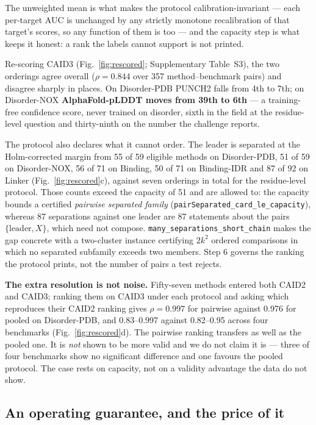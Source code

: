\documentclass[11pt,a4paper]{article}
\newcommand{\code}[1]{\texttt{\small #1}}
\begin{document}
The unweighted mean is what makes the protocol calibration-invariant --- each
per-target AUC is unchanged by any strictly monotone recalibration of that
target's scores, so any function of them is too --- and the capacity step is what
keeps it honest: a rank the labels cannot support is not printed.

Re-scoring CAID3 (Fig.~\ref{fig:rescored}; Supplementary Table~S3), the two
orderings agree overall ($\rho = 0.844$ over 357 method--benchmark pairs) and
disagree sharply in places. On Disorder-PDB PUNCH2 falls from 4th to 7th; on
Disorder-NOX \textbf{AlphaFold-pLDDT moves from 39th to 6th} --- a training-free
confidence score, never trained on disorder, sixth in the field at the
residue-level question and thirty-ninth on the number the challenge reports.

The protocol also declares what it cannot order. The leader is separated at the
Holm-corrected margin from 55 of 59 eligible methods on Disorder-PDB, 51 of 59
on Disorder-NOX, 56 of 71 on Binding, 50 of 71 on Binding-IDR and 87 of 92 on
Linker (Fig.~\ref{fig:rescored}c), against seven orderings in total for the
residue-level protocol. Those counts exceed the capacity of 51 and are allowed
to: the capacity bounds a certified \emph{pairwise separated family}
(\code{pairSeparated\_card\_le\_capacity}), whereas 87 separations against one
leader are 87 statements about the pairs $\{\text{leader}, X\}$, which need not
compose. \code{many\_separations\_short\_chain} makes the gap concrete with a
two-cluster instance certifying $2k^2$ ordered comparisons in which no separated
subfamily exceeds two members. Step 6 governs the ranking the protocol prints,
not the number of pairs a test rejects.

\textbf{The extra resolution is not noise.} Fifty-seven methods entered both
CAID2 and CAID3; ranking them on CAID3 under each protocol and asking which
reproduces their CAID2 ranking gives $\rho = 0.997$ for pairwise against 0.976
for pooled on Disorder-PDB, and 0.83--0.997 against 0.82--0.95 across four
benchmarks (Fig.~\ref{fig:rescored}d). The pairwise ranking transfers as well as
the pooled one. It is \emph{not} shown to be more valid and we do not claim it
is --- three of four benchmarks show no significant difference and one favours
the pooled protocol. The case rests on capacity, not on a validity advantage the
data do not show.

\subsection*{An operating guarantee, and the price of it}
\end{document}
